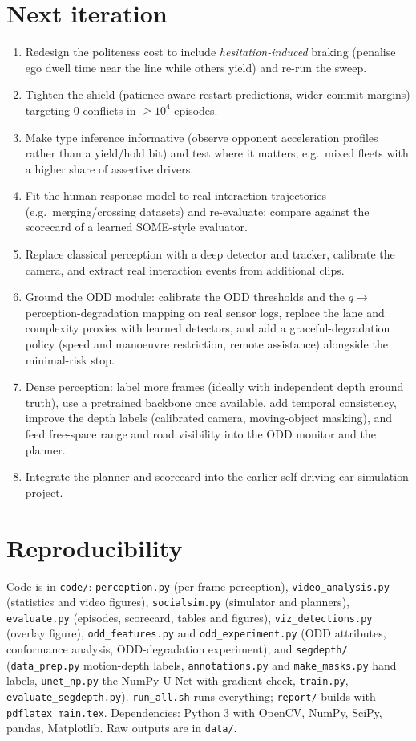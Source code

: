 \documentclass[11pt,a4paper]{article}
\begin{document}
\section{Next iteration}\label{sec:next}
\begin{enumerate}\setlength\itemsep{1pt}
\item Redesign the politeness cost to include \emph{hesitation-induced} braking (penalise ego dwell time near the line while others yield) and re-run the sweep.
\item Tighten the shield (patience-aware restart predictions, wider commit margins) targeting 0 conflicts in $\ge10^4$ episodes.
\item Make type inference informative (observe opponent acceleration profiles rather than a yield/hold bit) and test where it matters, e.g.\ mixed fleets with a higher share of assertive drivers.
\item Fit the human-response model to real interaction trajectories (e.g.\ merging/crossing datasets) and re-evaluate; compare against the scorecard of a learned SOME-style evaluator.
\item Replace classical perception with a deep detector and tracker, calibrate the camera, and extract real interaction events from additional clips.
\item Ground the ODD module: calibrate the ODD thresholds and the $q\to$ perception-degradation mapping on real sensor logs, replace the lane and complexity proxies with learned detectors, and add a graceful-degradation policy (speed and manoeuvre restriction, remote assistance) alongside the minimal-risk stop.
\item Dense perception: label more frames (ideally with independent depth ground truth), use a pretrained backbone once available, add temporal consistency, improve the depth labels (calibrated camera, moving-object masking), and feed free-space range and road visibility into the ODD monitor and the planner.
\item Integrate the planner and scorecard into the earlier self-driving-car simulation project.
\end{enumerate}

\section{Reproducibility}
Code is in \texttt{code/}: \texttt{perception.py} (per-frame perception), \texttt{video\_analysis.py} (statistics and video figures), \texttt{socialsim.py} (simulator and planners), \texttt{evaluate.py} (episodes, scorecard, tables and figures), \texttt{viz\_detections.py} (overlay figure), \texttt{odd\_features.py} and \texttt{odd\_experiment.py} (ODD attributes, conformance analysis, ODD-degradation experiment), and \texttt{segdepth/} (\texttt{data\_prep.py} motion-depth labels, \texttt{annotations.py} and \texttt{make\_masks.py} hand labels, \texttt{unet\_np.py} the NumPy U-Net with gradient check, \texttt{train.py}, \texttt{evaluate\_segdepth.py}). \texttt{run\_all.sh} runs everything; \texttt{report/} builds with \texttt{pdflatex main.tex}. Dependencies: Python 3 with OpenCV, NumPy, SciPy, pandas, Matplotlib. Raw outputs are in \texttt{data/}.
\end{document}
